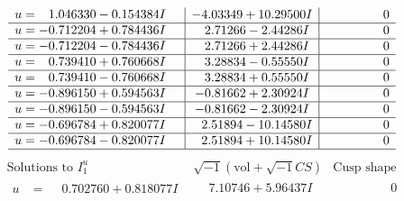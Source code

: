 \documentclass[1p]{elsarticle_modified}
\theoremstyle{definition}
\newcommand{\I}{\sqrt{-1}}
\begin{document}
$$\begin{array}{c|c|c}
\begin{aligned}
u &= \phantom{-}1.046330 - 0.154384 I\end{aligned}
 & -4.03349 + 10.29500 I & \phantom{-0.000000 } 0 \\ \hline\begin{aligned}
u &= -0.712204 + 0.784436 I\end{aligned}
 & \phantom{-}2.71266 - 2.44286 I & \phantom{-0.000000 } 0 \\ \hline\begin{aligned}
u &= -0.712204 - 0.784436 I\end{aligned}
 & \phantom{-}2.71266 + 2.44286 I & \phantom{-0.000000 } 0 \\ \hline\begin{aligned}
u &= \phantom{-}0.739410 + 0.760668 I\end{aligned}
 & \phantom{-}3.28834 - 0.55550 I & \phantom{-0.000000 } 0 \\ \hline\begin{aligned}
u &= \phantom{-}0.739410 - 0.760668 I\end{aligned}
 & \phantom{-}3.28834 + 0.55550 I & \phantom{-0.000000 } 0 \\ \hline\begin{aligned}
u &= -0.896150 + 0.594563 I\end{aligned}
 & -0.81662 + 2.30924 I & \phantom{-0.000000 } 0 \\ \hline\begin{aligned}
u &= -0.896150 - 0.594563 I\end{aligned}
 & -0.81662 - 2.30924 I & \phantom{-0.000000 } 0 \\ \hline\begin{aligned}
u &= -0.696784 + 0.820077 I\end{aligned}
 & \phantom{-}2.51894 - 10.14580 I & \phantom{-0.000000 } 0 \\ \hline\begin{aligned}
u &= -0.696784 - 0.820077 I\end{aligned}
 & \phantom{-}2.51894 + 10.14580 I & \phantom{-0.000000 } 0\\
 \hline 
 \end{array}$$\newpage$$\begin{array}{c|c|c}  
\text{Solutions to }I^u_{1}& \I (\text{vol} + \sqrt{-1}CS) & \text{Cusp shape}\\
 \hline 
\begin{aligned}
u &= \phantom{-}0.702760 + 0.818077 I\end{aligned}
 & \phantom{-}7.10746 + 5.96437 I & \phantom{-0.000000 } 0 \\ \hline\begin{aligned}

\end{aligned}
\end{array}$$
\end{document}
